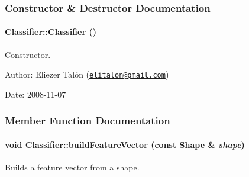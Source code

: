 \subsubsection{Constructor \& Destructor Documentation}
\hypertarget{class_classifier_e6132b100c96a4f3d8ad3885b5acb28e}{
\paragraph[{Classifier}]{\setlength{\rightskip}{0pt plus 5cm}Classifier::Classifier ()}\hfill}
\label{class_classifier_e6132b100c96a4f3d8ad3885b5acb28e}


Constructor. 

\begin{Desc}
\item[Author:]Eliezer Talón (\href{mailto:elitalon@gmail.com}{\tt elitalon@gmail.com}) \end{Desc}
\begin{Desc}
\item[Date:]2008-11-07 \end{Desc}


\subsubsection{Member Function Documentation}
\hypertarget{class_classifier_6c5a7ef6298b0f0d84873297f1e8c7e9}{
\paragraph[{buildFeatureVector}]{\setlength{\rightskip}{0pt plus 5cm}void Classifier::buildFeatureVector (const {\bf Shape} \& {\em shape})}\hfill}
\label{class_classifier_6c5a7ef6298b0f0d84873297f1e8c7e9}


Builds a feature vector from a shape. 

